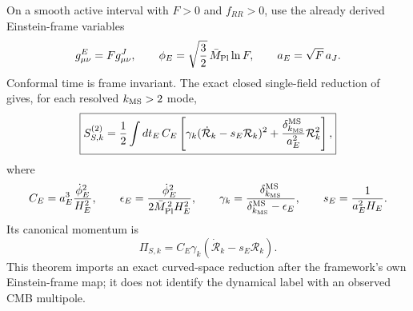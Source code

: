 \documentclass[12pt,a4paper]{article}
\begin{document}
\begin{theorem}
\label{p8:thm:v189-curved-scalar-kernel}
On a smooth active interval with $F>0$ and $f_{RR}>0$, use the already derived
Einstein-frame variables
\[
 g^E_{\mu\nu}=Fg^J_{\mu\nu},\qquad
 \phi_E=\sqrt{\frac32}\,\bar M_{\rm Pl}\ln F,
 \qquad a_E=\sqrt F\,a_J.
\]
Conformal time is frame invariant.  The exact closed single-field reduction
of \cite{Handley2019CurvedInflating} gives, for each resolved
$k_{\rm MS}>2$ mode,
\[
 \boxed{S_{S,k}^{(2)}=\frac12\int dt_E\,C_E\left[
 \gamma_k(\dot{\mathcal R}_k-s_E\mathcal R_k)^2
 +\frac{\delta_{k_{\rm MS}}^{\rm MS}}{a_E^2}\mathcal R_k^2\right],}
\]
where
\[
 C_E=a_E^3\frac{\dot\phi_E^2}{H_E^2},\qquad
 \epsilon_E=\frac{\dot\phi_E^2}{2\bar M_{\rm Pl}^{\,2}H_E^2},\qquad
 \gamma_k=\frac{\delta_{k_{\rm MS}}^{\rm MS}}{\delta_{k_{\rm MS}}^{\rm MS}-\epsilon_E},\qquad
 s_E=\frac1{a_E^2H_E}.
\]
Its canonical momentum is
\[
 \boxed{\Pi_{S,k}=C_E\gamma_k
 (\dot{\mathcal R}_k-s_E\mathcal R_k).}
\]
This theorem imports an exact curved-space reduction after the framework's
own Einstein-frame map; it does not identify the dynamical label with an
observed CMB multipole.
\end{theorem}
\end{document}
